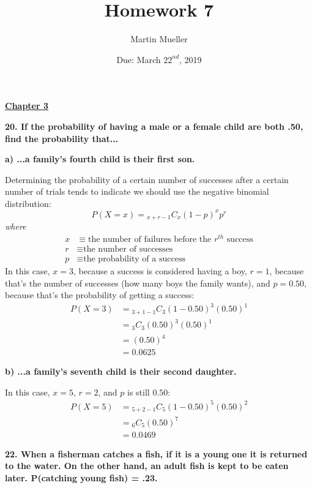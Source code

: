 \documentclass[12pt, letter]{article}
\title{Homework 7}
\author{Martin Mueller}
\date{Due: March $22^{nd}$, 2019}
\begin{document}
\maketitle

\begin{center}
	\underline{\textbf{Chapter 3}}
\end{center}

\textbf{20. If the probability of having a male or a female child are both .50, find the probability that...}

\qquad \textbf{a) ...a family's fourth child is their first son.}
\begin{center}
	Determining the probability of a certain number of successes after a certain number of trials tends to indicate we should use the negative binomial distribution:
	$$P(X=x) = {}_{x+r-1}C_{x}(1-p)^{x}p^{r}$$
	\textit{where}
	\begin{align*}
		x &\equiv \text{the number of failures before the }r^{th}\text{ success} \\
		r &\equiv \text{the number of successes} \\
		p &\equiv \text{the probability of a success}
	\end{align*}
	In this case, $x=3$, because a success is considered having a boy, $r=1$, because that's the number of successes (how many boys the family wants), and $p=0.50$, because that's the probability of getting a success:
	\begin{align*}
		P(X=3) &= {}_{3+1-1}C_{3}(1-0.50)^{3}(0.50)^{1} \\
		&= {}_{3}C_{3}(0.50)^{3}(0.50)^{1} \\
		&= (0.50)^{4} \\
		&= \boxed{0.0625}
	\end{align*}
\end{center}

\pagebreak

\qquad \textbf{b) ...a family's seventh child is their second daughter.}
\begin{center}
	In this case, $x=5$, $r=2$, and $p$ is still $0.50$:
	\begin{align*}
		P(X=5) &= {}_{5+2-1}C_{5}(1-0.50)^{5}(0.50)^{2} \\
		&= {}_{6}C_{5}(0.50)^{7} \\
		&= \boxed{0.0469}
	\end{align*}
\end{center}

\textbf{22. When a fisherman catches a fish, if it is a young one it is returned to the water. On the other hand, an adult fish is kept to be eaten later. P(catching young fish) = .23.}
\end{document}
